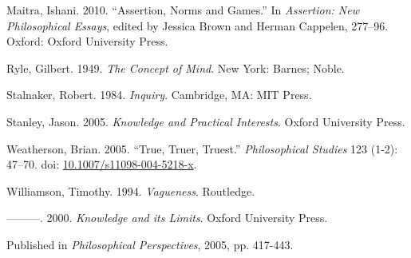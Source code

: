 \documentclass[
  10pt,
  letterpaper,
  DIV=11,
  numbers=noendperiod,
  twoside]{scrartcl}
\newlength{\cslhangindent}
\newenvironment{CSLReferences}[2] %
 {\begin{list}{}{%
  \setlength{\itemindent}{0pt}
  \setlength{\leftmargin}{0pt}
  \setlength{\parsep}{0pt}
  \ifodd #1
   \setlength{\leftmargin}{\cslhangindent}
   \setlength{\itemindent}{-1\cslhangindent}
  \fi
  \setlength{\itemsep}{#2\baselineskip}}}
 {\end{list}}
\begin{document}
\begin{CSLReferences}{1}{0}
Maitra, Ishani. 2010. {``Assertion, Norms and Games.''} In
\emph{Assertion: New Philosophical Essays}, edited by Jessica Brown and
Herman Cappelen, 277--96. Oxford: Oxford University Press.

Ryle, Gilbert. 1949. \emph{The Concept of Mind}. New York: Barnes;
Noble.

Stalnaker, Robert. 1984. \emph{Inquiry}. Cambridge, MA: MIT Press.

Stanley, Jason. 2005. \emph{{Knowledge and Practical Interests}}. Oxford
University Press.

Weatherson, Brian. 2005. {``{True, Truer, Truest}.''}
\emph{Philosophical Studies} 123 (1-2): 47--70. doi:
\href{https://doi.org/10.1007/s11098-004-5218-x}{10.1007/s11098-004-5218-x}.

Williamson, Timothy. 1994. \emph{{Vagueness}}. Routledge.

---------. 2000. \emph{{Knowledge and its Limits}}. Oxford University
Press.

\end{CSLReferences}



\noindent Published in\emph{
Philosophical Perspectives}, 2005, pp. 417-443.
\end{document}
